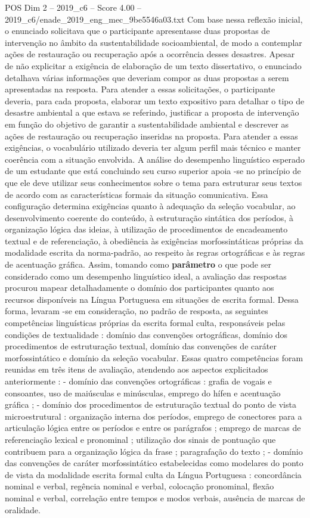 \begin{textsample}{POS Dim 2 – 2019\_c6 – Score 4.00 – 2019\_c6/enade\_2019\_eng\_mec\_9be5546a03.txt}
Com base nessa reflexão inicial, o enunciado solicitava que o participante apresentasse duas propostas de intervenção no âmbito da sustentabilidade socioambiental, de modo a contemplar ações de restauração ou recuperação após a ocorrência desses desastres.
Apesar de não explicitar a exigência de elaboração de um texto dissertativo, o enunciado detalhava várias informações que deveriam compor as duas propostas a serem apresentadas na resposta.
Para atender a essas solicitações, o participante deveria, para cada proposta, elaborar um texto expositivo para detalhar o tipo de desastre ambiental a que estava se referindo, justificar a proposta de intervenção em função do objetivo de garantir a sustentabilidade ambiental e descrever as ações de restauração ou recuperação inseridas na proposta.
Para atender a essas exigências, o vocabulário utilizado deveria ter algum perfil mais técnico e manter coerência com a situação envolvida.
A análise do desempenho linguístico esperado de um estudante que está concluindo seu curso superior apoia -se no princípio de que ele deve utilizar seus conhecimentos sobre o tema para estruturar seus textos de acordo com as características formais da situação comunicativa.
Essa configuração determina exigências quanto à adequação da seleção vocabular, ao desenvolvimento coerente do conteúdo, à estruturação sintática dos períodos, à organização lógica das ideias, à utilização de procedimentos de encadeamento textual e de referenciação, à obediência às exigências morfossintáticas próprias da modalidade escrita da norma-padrão, ao respeito às regras ortográficas e às regras de acentuação gráfica.
Assim, tomando como \textbf{parâmetro} o que pode ser considerado como um desempenho linguístico ideal, a avaliação das respostas procurou mapear detalhadamente o domínio dos participantes quanto aos recursos disponíveis na Língua Portuguesa em situações de escrita formal.
Dessa forma, levaram -se em consideração, no padrão de resposta, as seguintes competências linguísticas próprias da escrita formal culta, responsáveis pelas condições de textualidade : domínio das convenções ortográficas, domínio dos procedimentos de estruturação textual, domínio das convenções de caráter morfossintático e domínio da seleção vocabular.
Essas quatro competências foram reunidas em três itens de avaliação, atendendo aos aspectos explicitados anteriormente : - domínio das convenções ortográficas : grafia de vogais e consoantes, uso de maiúsculas e minúsculas, emprego do hífen e acentuação gráfica ; - domínio dos procedimentos de estruturação textual do ponto de vista microestrutural : organização interna dos períodos, emprego de conectores para a articulação lógica entre os períodos e entre os parágrafos ; emprego de marcas de referenciação lexical e pronominal ; utilização dos sinais de pontuação que contribuem para a organização lógica da frase ; paragrafação do texto ; - domínio das convenções de caráter morfossintático estabelecidas como modelares do ponto de vista da modalidade escrita formal culta da Língua Portuguesa : concordância nominal e verbal, regência nominal e verbal, colocação pronominal, flexão nominal e verbal, correlação entre tempos e modos verbais, ausência de marcas de oralidade.

\end{textsample}
